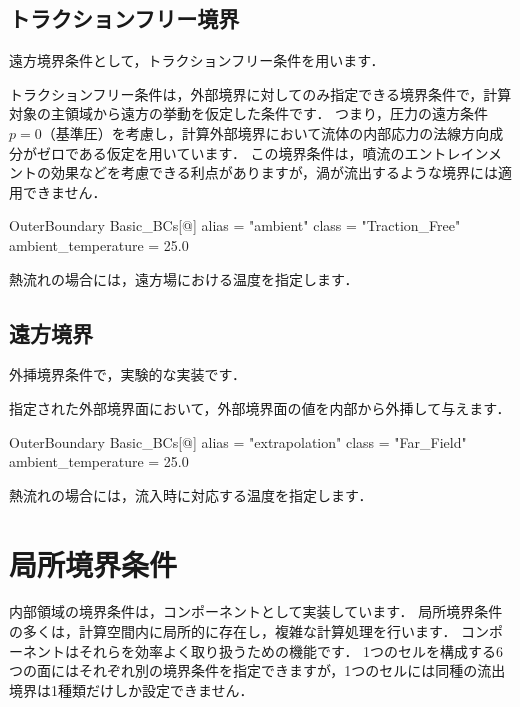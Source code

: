 \pagebreak
\subsection{トラクションフリー境界}

遠方境界条件として，トラクションフリー条件を用います．

\vspace{2mm}

トラクションフリー条件は，外部境界に対してのみ指定できる境界条件で，計算対象の主領域から遠方の挙動を仮定した条件です．
つまり，圧力の遠方条件$p=0$（基準圧）を考慮し，計算外部境界において流体の内部応力の法線方向成分がゼロである仮定を用いています．
この境界条件は，噴流のエントレインメントの効果などを考慮できる利点がありますが，渦が流出するような境界には適用できません．

{\small
\begin{program}
OuterBoundary {
  Basic_BCs[@] {
    alias    = "ambient"
    class    = "Traction_Free"
    ambient_temperature = 25.0
  }
}
\end{program}
}

熱流れの場合には，遠方場における温度を指定します．



\pagebreak
\subsection{遠方境界}

外挿境界条件で，実験的な実装です．

\vspace{2mm}

指定された外部境界面において，外部境界面の値を内部から外挿して与えます．

{\small
\begin{program}
OuterBoundary {
  Basic_BCs[@] {
    alias    = "extrapolation"
    class    = "Far_Field"
    ambient_temperature = 25.0
  }
}
\end{program}
}

熱流れの場合には，流入時に対応する温度を指定します．



\pagebreak
\section{局所境界条件}
内部領域の境界条件は，コンポーネントとして実装しています．
局所境界条件の多くは，計算空間内に局所的に存在し，複雑な計算処理を行います．
コンポーネントはそれらを効率よく取り扱うための機能です．
1つのセルを構成する6つの面にはそれぞれ別の境界条件を指定できますが，1つのセルには同種の流出境界は1種類だけしか設定できません．

